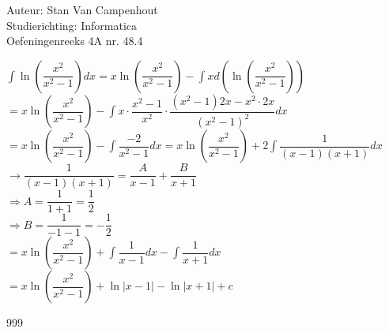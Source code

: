 \documentclass[a4paper]{article}
\begin{document}
  
\noindent \large Auteur: Stan Van Campenhout \\
\noindent \large Studierichting:  Informatica\\
\noindent \large Oefeningenreeks 4A nr. 48.4\\

\medskip

\normalsize

$ \displaystyle\int\ln\left(\dfrac{x^2}{x^2-1}\right)dx = x\ln\left(\dfrac{x^2}{x^2-1}\right) - \displaystyle\int xd\left(\ln\left(\dfrac{x^2}{x^2-1}\right)\right)$\\

$ =  x\ln\left(\dfrac{x^2}{x^2-1}\right) - \displaystyle\int x\cdot\dfrac{x^2-1}{x^2}\cdot\dfrac{\left(x^2-1\right)2x-x^2\cdot2x}{\left(x^2-1\right)^2}dx $\\

$ =  x\ln\left(\dfrac{x^2}{x^2-1}\right) - \displaystyle\int\dfrac{-2}{x^2-1}dx =  x\ln\left(\dfrac{x^2}{x^2-1}\right) +2\displaystyle\int\dfrac{1}{\left(x-1\right)\left(x+1\right)}dx $\\

$ \rightarrow \dfrac{1}{\left(x-1\right)\left(x+1\right)} = \dfrac{A}{x-1}+\dfrac{B}{x+1} $\\

$ \Rightarrow A = \dfrac{1}{1+1} = \dfrac{1}{2} $\\

$ \Rightarrow B = \dfrac{1}{-1-1} = -\dfrac{1}{2} $\\

$ =  x\ln\left(\dfrac{x^2}{x^2-1}\right) + \displaystyle\int\dfrac{1}{x-1}dx-\displaystyle\int\dfrac{1}{x+1}dx $\\

$ =  x\ln\left(\dfrac{x^2}{x^2-1}\right) + \ln|x-1| - \ln|x+1| + c $\\

\begin{thebibliography}{999}
\end{thebibliography}
\end{document}
